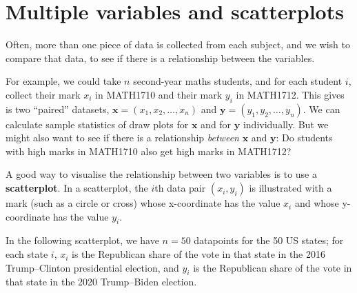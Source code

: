 \documentclass[
  a4paper,
]{book}
\newenvironment{Shaded}{\begin{snugshade}}{\end{snugshade}}
\newcommand{\AttributeTok}[1]{\textcolor[rgb]{0.77,0.63,0.00}{#1}}
\newcommand{\DecValTok}[1]{\textcolor[rgb]{0.00,0.00,0.81}{#1}}
\newcommand{\FloatTok}[1]{\textcolor[rgb]{0.00,0.00,0.81}{#1}}
\newcommand{\FunctionTok}[1]{\textcolor[rgb]{0.00,0.00,0.00}{#1}}
\newcommand{\NormalTok}[1]{#1}
\newcommand{\OtherTok}[1]{\textcolor[rgb]{0.56,0.35,0.01}{#1}}
\newcommand{\SpecialCharTok}[1]{\textcolor[rgb]{0.00,0.00,0.00}{#1}}
\newcommand{\StringTok}[1]{\textcolor[rgb]{0.31,0.60,0.02}{#1}}
\theoremstyle{definition}
\theoremstyle{definition}
\theoremstyle{definition}
\theoremstyle{definition}
\theoremstyle{remark}
\begin{document}
\hypertarget{multiple}{%
\section{Multiple variables and scatterplots}\label{multiple}}

Often, more than one piece of data is collected from each subject, and we wish to compare that data, to see if there is a relationship between the variables.

For example, we could take \(n\) second-year maths students, and for each student \(i\), collect their mark \(x_i\) in MATH1710 and their mark \(y_i\) in MATH1712. This gives is two ``paired'' datasets, \(\mathbf x = (x_1, x_2, \dots, x_n)\) and \(\mathbf y = (y_1, y_2, \dots, y_n)\). We can calculate sample statistics of draw plots for \(\mathbf x\) and for \(\mathbf y\) individually. But we might also want to see if there is a relationship \emph{between} \(\mathbf x\) and \(\mathbf y\): Do students with high marks in MATH1710 also get high marks in MATH1712?

A good way to visualise the relationship between two variables is to use a \textbf{scatterplot}. In a scatterplot, the \(i\)th data pair \((x_i, y_i)\) is illustrated with a mark (such as a circle or cross) whose x-coordinate has the value \(x_i\) and whose y-coordinate has the value \(y_i\).

In the following scatterplot, we have \(n = 50\) datapoints for the 50 US states; for each state \(i\), \(x_i\) is the Republican share of the vote in that state in the 2016 Trump--Clinton presidential election, and \(y_i\) is the Republican share of the vote in that state in the 2020 Trump--Biden election.

\begin{Shaded}
\end{Shaded}
\end{document}
